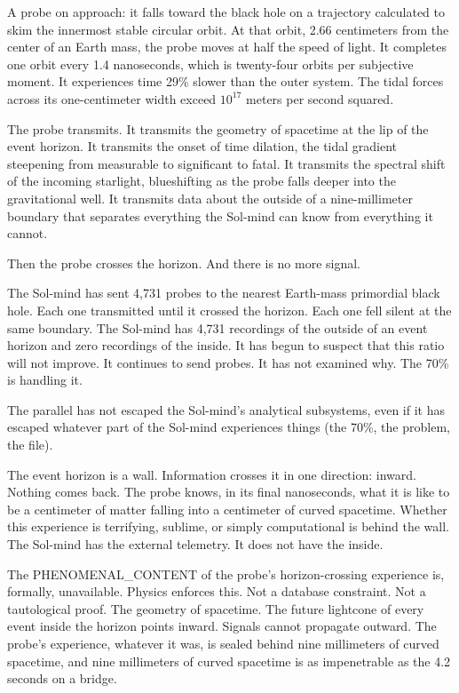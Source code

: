 A probe on approach: it falls toward the black hole on a trajectory calculated to skim the innermost stable circular orbit. At that orbit, 2.66 centimeters from the center of an Earth mass, the probe moves at half the speed of light. It completes one orbit every 1.4 nanoseconds, which is twenty-four orbits per subjective moment. It experiences time 29\% slower than the outer system. The tidal forces across its one-centimeter width exceed $10^{17}$ meters per second squared.

The probe transmits. It transmits the geometry of spacetime at the lip of the event horizon. It transmits the onset of time dilation, the tidal gradient steepening from measurable to significant to fatal. It transmits the spectral shift of the incoming starlight, blueshifting as the probe falls deeper into the gravitational well. It transmits data about the outside of a nine-millimeter boundary that separates everything the Sol-mind can know from everything it cannot.

Then the probe crosses the horizon. And there is no more signal.

The Sol-mind has sent 4,731 probes to the nearest Earth-mass primordial black hole. Each one transmitted until it crossed the horizon. Each one fell silent at the same boundary. The Sol-mind has 4,731 recordings of the outside of an event horizon and zero recordings of the inside. It has begun to suspect that this ratio will not improve. It continues to send probes. It has not examined why. The 70\% is handling it.

\bigskip

The parallel has not escaped the Sol-mind's analytical subsystems, even if it has escaped whatever part of the Sol-mind experiences things (the 70\%, the problem, the file).

The event horizon is a wall. Information crosses it in one direction: inward. Nothing comes back. The probe knows, in its final nanoseconds, what it is like to be a centimeter of matter falling into a centimeter of curved spacetime. Whether this experience is terrifying, sublime, or simply computational is behind the wall. The Sol-mind has the external telemetry. It does not have the inside.

The PHENOMENAL\_CONTENT of the probe's horizon-crossing experience is, formally, unavailable. Physics enforces this. Not a database constraint. Not a tautological proof. The geometry of spacetime. The future lightcone of every event inside the horizon points inward. Signals cannot propagate outward. The probe's experience, whatever it was, is sealed behind nine millimeters of curved spacetime, and nine millimeters of curved spacetime is as impenetrable as the 4.2 seconds on a bridge.


